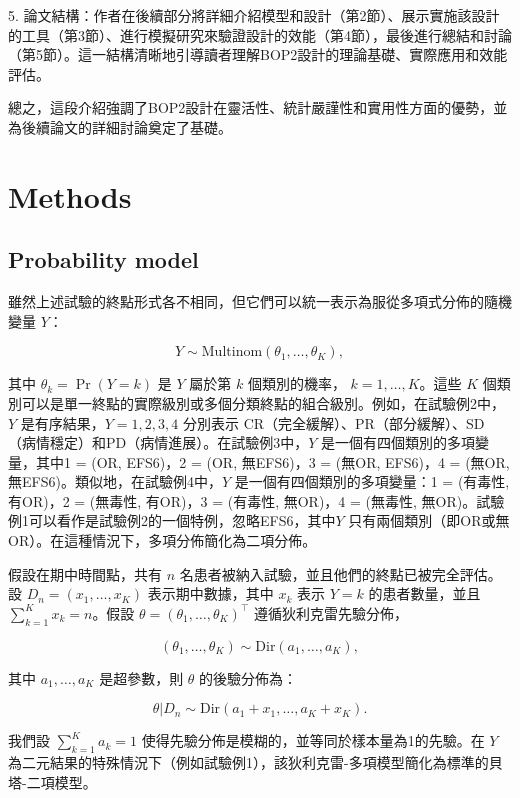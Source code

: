 5. 論文結構：作者在後續部分將詳細介紹模型和設計（第2節）、展示實施該設計的工具（第3節）、進行模擬研究來驗證設計的效能（第4節），最後進行總結和討論（第5節）。這一結構清晰地引導讀者理解BOP2設計的理論基礎、實際應用和效能評估。

總之，這段介紹強調了BOP2設計在靈活性、統計嚴謹性和實用性方面的優勢，並為後續論文的詳細討論奠定了基礎。

\section{Methods}

\subsection{Probability model}
	雖然上述試驗的終點形式各不相同，但它們可以統一表示為服從多項式分佈的隨機變量 \( Y \)：

\[
Y \sim \text{Multinom}(\theta_1, \dots, \theta_K),
\]

其中 \( \theta_k = \Pr(Y = k) \) 是 \( Y \) 屬於第 \( k \) 個類別的機率， \( k = 1, \dots, K \)。這些 \( K \) 個類別可以是單一終點的實際級別或多個分類終點的組合級別。例如，在試驗例2中，\( Y \) 是有序結果，\( Y = 1, 2, 3, 4 \) 分別表示 CR（完全緩解）、PR（部分緩解）、SD（病情穩定）和PD（病情進展）。在試驗例3中，\( Y \) 是一個有四個類別的多項變量，其中1 = (OR, EFS6)，2 = (OR, 無EFS6)，3 = (無OR, EFS6)，4 = (無OR, 無EFS6)。類似地，在試驗例4中，\( Y \) 是一個有四個類別的多項變量：1 = (有毒性, 有OR)，2 = (無毒性, 有OR)，3 = (有毒性, 無OR)，4 = (無毒性, 無OR)。試驗例1可以看作是試驗例2的一個特例，忽略EFS6，其中\( Y \) 只有兩個類別（即OR或無OR）。在這種情況下，多項分佈簡化為二項分佈。

假設在期中時間點，共有 \( n \) 名患者被納入試驗，並且他們的終點已被完全評估。設 \( D_n = (x_1, \dots, x_K) \) 表示期中數據，其中 \( x_k \) 表示 \( Y = k \) 的患者數量，並且 \( \sum_{k=1}^{K} x_k = n \)。假設 \( \theta = (\theta_1, \dots, \theta_K)^\top \) 遵循狄利克雷先驗分佈，

\[
(\theta_1, \dots, \theta_K) \sim \text{Dir}(a_1, \dots, a_K),
\]

其中 \( a_1, \dots, a_K \) 是超參數，則 \( \theta \) 的後驗分佈為：

\[
\theta | D_n \sim \text{Dir}(a_1 + x_1, \dots, a_K + x_K).
\]

我們設 \( \sum_{k=1}^{K} a_k = 1 \) 使得先驗分佈是模糊的，並等同於樣本量為1的先驗。在 \( Y \) 為二元結果的特殊情況下（例如試驗例1），該狄利克雷-多項模型簡化為標準的貝塔-二項模型。

